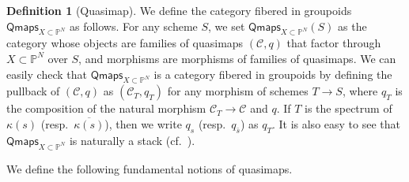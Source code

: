 \documentclass[12pt,twoside]{amsart}
\theoremstyle{definition}
\newtheorem{defn}[thm]{Definition}
\begin{document}
\begin{defn}[Quasimap]
We define the category fibered in groupoids $\mathsf{Qmaps}_{X\subset\mathbb{P}^N}$ as follows.
For any scheme $S$, we set $\mathsf{Qmaps}_{X\subset\mathbb{P}^N}(S)$ as the category whose objects are families of quasimaps $(\mathcal{C},q)$ that factor through $X\subset \mathbb{P}^N$ over $S$, and morphisms are morphisms of families of quasimaps.
We can easily check that $\mathsf{Qmaps}_{X\subset\mathbb{P}^N}$ is a category fibered in groupoids by defining the pullback of $(\mathcal{C},q)$ as $(\mathcal{C}_T,q_T)$ for any morphism of schemes $T\to S$, where $q_T$ is the composition of the natural morphism $\mathcal{C}_T\to \mathcal{C}$ and $q$.
If $T$ is the spectrum of $\kappa(s)$ (resp.~$\overline{\kappa(s)}$), then we write $q_s$ (resp.~$q_{\bar{s}}$) as $q_T$.
It is also easy to see that $\mathsf{Qmaps}_{X\subset\mathbb{P}^N}$ is naturally a stack (cf.~\cite[Subsection 2.3]{CFKM}).
\end{defn}




We define the following fundamental notions of quasimaps.
\end{document}
